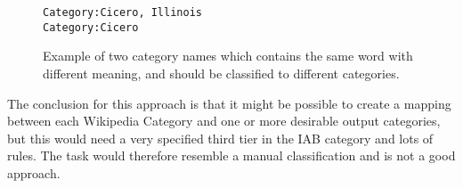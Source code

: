 \begin{figure}[h]
\centering
\begin{lstlisting}
Category:Cicero, Illinois
Category:Cicero
\end{lstlisting}
\caption{Example of two category names which contains the same word with different meaning, and should be classified to different categories.}
\label{fig:ambiguous_category_name}
\end{figure}


The conclusion for this approach is that it might be possible to create a mapping between each Wikipedia Category and one or more desirable output categories, but this would need a very specified third tier in the IAB category and lots of rules. The task would therefore resemble a manual classification and is not a good approach. 


